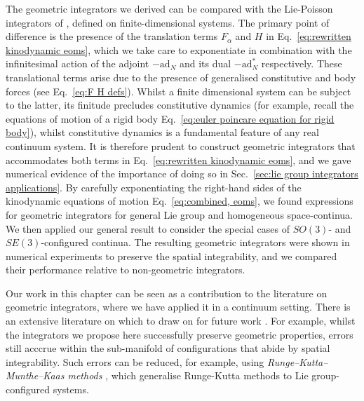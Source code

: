 \documentclass[]{cam-thesis}
\begin{document}
 The geometric integrators we derived can be compared with the Lie-Poisson integrators of \citep{munthe-kaasHighOrderRungeKutta1999, buddGeometricIntegrationNumerical1999, engoNumericalIntegrationLie2001}, defined on finite-dimensional systems. The primary point of difference is the presence of the translation terms $F_\alpha$ and $H$ in Eq.~\ref{eq:rewritten kinodynamic eoms}, which we take care to exponentiate in combination with the infinitesimal action of the adjoint $-\text{ad}_N$ and its dual $-\text{ad}^*_N$ respectively. These translational terms arise due to the presence of generalised constitutive and body forces (see Eq.~\ref{eq:F H defs}). Whilst a finite dimensional system can be subject to the latter, its finitude precludes constitutive dynamics (for example, recall the equations of motion of a rigid body Eq.~\ref{eq:euler poincare equation for rigid body}), whilst constitutive dynamics is a fundamental feature of any real continuum system. It is therefore prudent to construct geometric integrators that accommodates both terms in Eq.~\ref{eq:rewritten kinodynamic eoms}, and we gave numerical evidence of the importance of doing so in Sec.~\ref{sec:lie group integrators applications}. By carefully exponentiating the right-hand sides of the kinodynamic equations of motion Eq.~\ref{eq:combined, eoms}, we found expressions for geometric integrators for general Lie group and homogeneous space-continua. We then applied our general result to consider the special cases of $SO(3)$- and $SE(3)$-configured continua. The resulting geometric integrators were shown in numerical experiments to preserve the spatial integrability, and we compared their performance relative to non-geometric integrators.
 
 Our work in this chapter can be seen as a contribution to the literature on geometric integrators, where we have applied it in a continuum setting. There is an extensive literature on which to draw on for future work \citep{celledoniIntroductionLieGroup2014c, owrenLieGroupIntegrators2016, iserlesLiegroupMethods2005, celledoniLieGroupIntegrators2022a, munthe-kaasHighOrderRungeKutta1999, buddGeometricIntegrationNumerical1999, engoNumericalIntegrationLie2001}. For example, whilst the integrators we propose here successfully preserve geometric properties, errors still acccrue within the sub-manifold of configurations that abide by spatial integrability. Such errors can be reduced, for example, using \textit{Runge–Kutta–Munthe–Kaas methods} \citep{munthe-kaasRungeKuttaMethodsLie1998, kaasHighOrderRungeKutta1999}, which generalise Runge-Kutta methods \citep{ascherComputerMethodsOrdinary1998} to Lie group-configured systems.
\end{document}
